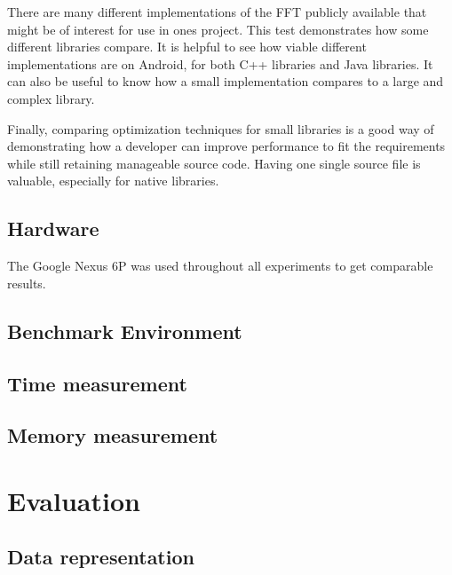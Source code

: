 There are many different implementations of the FFT publicly available that might be of interest for use in ones project. This test demonstrates how some different libraries compare. It is helpful to see how viable different implementations are on Android, for both C++ libraries and Java libraries. It can also be useful to know how a small implementation compares to a large and complex library.

Finally, comparing optimization techniques for small libraries is a good way of demonstrating how a developer can improve performance to fit the requirements while still retaining manageable source code. Having one single source file is valuable, especially for native libraries.

\subsection{Hardware}
The Google Nexus 6P was used throughout all experiments to get comparable results.

\subsection{Benchmark Environment}

\subsection{Time measurement}

\subsection{Memory measurement}

\section{Evaluation}

\subsection{Data representation}
